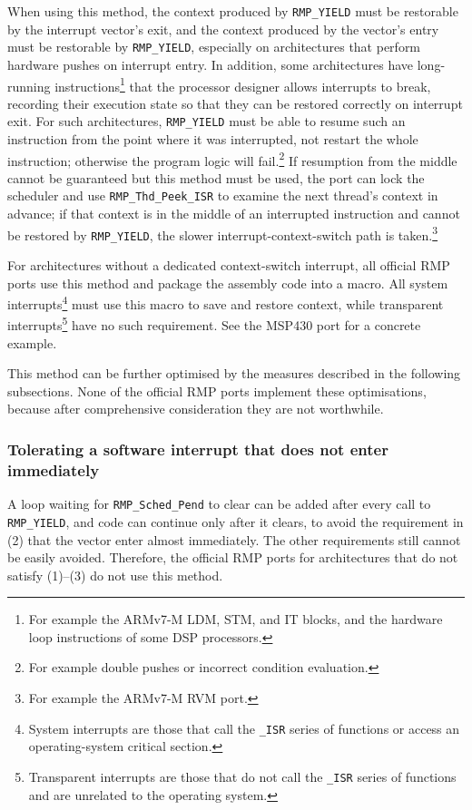 When using this method, the context produced by \texttt{RMP\_YIELD} must be restorable by the interrupt vector's exit, and the context produced by the vector's entry must be restorable by \texttt{RMP\_YIELD}, especially on architectures that perform hardware pushes on interrupt entry.
In addition, some architectures have long-running instructions\footnote{For example the ARMv7-M LDM, STM, and IT blocks, and the hardware loop instructions of some DSP processors.} that the processor designer allows interrupts to break, recording their execution state so that they can be restored correctly on interrupt exit.
For such architectures, \texttt{RMP\_YIELD} must be able to resume such an instruction from the point where it was interrupted, not restart the whole instruction; otherwise the program logic will fail.\footnote{For example double pushes or incorrect condition evaluation.}
If resumption from the middle cannot be guaranteed but this method must be used, the port can lock the scheduler and use \texttt{RMP\_Thd\_Peek\_ISR} to examine the next thread's context in advance; if that context is in the middle of an interrupted instruction and cannot be restored by \texttt{RMP\_YIELD}, the slower interrupt-context-switch path is taken.\footnote{For example the ARMv7-M RVM port.}

For architectures without a dedicated context-switch interrupt, all official RMP ports use this method and package the assembly code into a macro.
All system interrupts\footnote{System interrupts are those that call the \texttt{\_ISR} series of functions or access an operating-system critical section.} must use this macro to save and restore context, while transparent interrupts\footnote{Transparent interrupts are those that do not call the \texttt{\_ISR} series of functions and are unrelated to the operating system.} have no such requirement.
See the MSP430 port for a concrete example.

This method can be further optimised by the measures described in the following subsections.
None of the official RMP ports implement these optimisations, because after comprehensive consideration they are not worthwhile.

\subsubsection{Tolerating a software interrupt that does not enter immediately}

A loop waiting for \texttt{RMP\_Sched\_Pend} to clear can be added after every call to \texttt{RMP\_YIELD}, and code can continue only after it clears, to avoid the requirement in (2) that the vector enter almost immediately.
The other requirements still cannot be easily avoided.
Therefore, the official RMP ports for architectures that do not satisfy (1)--(3) do not use this method.

